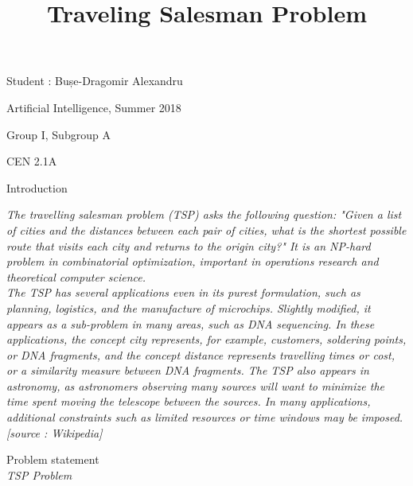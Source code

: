 \documentclass[12pt, a4paper]{article}
\title{Traveling Salesman Problem}
\author{}
\begin{document}
\vspace{3cm} 
\maketitle

\vspace{30mm} 
\centering
\large
Student : Bușe-Dragomir Alexandru

\vspace{10mm}
\centering
Artificial Intelligence, Summer 2018

\vspace{10mm}
\centering
Group I, Subgroup A

\centering
CEN 2.1A

\newpage

\vspace{20mm}
\centering
\Large 
Introduction

\vspace{30mm}
\centering
\large

\begin{flushleft}
\hspace{5mm}\textit{The travelling salesman problem (TSP) asks the following question: "Given a list of cities and the distances between each pair of cities, what is the shortest possible route that visits each city and returns to the origin city?" It is an NP-hard problem in combinatorial optimization, important in operations research and theoretical computer science.
\vspace{10mm}
\\
\hspace{5mm}The TSP has several applications even in its purest formulation, such as planning, logistics, and the manufacture of microchips. Slightly modified, it appears as a sub-problem in many areas, such as DNA sequencing. In these applications, the concept city represents, for example, customers, soldering points, or DNA fragments, and the concept distance represents travelling times or cost, or a similarity measure between DNA fragments. The TSP also appears in astronomy, as astronomers observing many sources will want to minimize the time spent moving the telescope between the sources. In many applications, additional constraints such as limited resources or time windows may be imposed. [source : Wikipedia]}
\end{flushleft}

\newpage

\vspace{30mm}
\centering
\Large 
Problem statement
\\
\vspace{2mm}
\centering
\Large 
\textit{TSP Problem}
\end{document}
